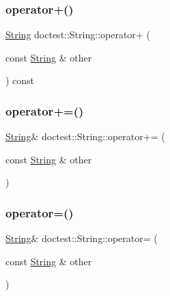 \mbox{\label{classdoctest_1_1_string_a6ddb6cf1b744a0ae1d4e26b3c8dfa827}} 
\subsubsection{\texorpdfstring{operator+()}{operator+()}}
{\footnotesize\ttfamily \hyperlink{classdoctest_1_1_string}{String} doctest\+::\+String\+::operator+ (\begin{DoxyParamCaption}\item[{const \hyperlink{classdoctest_1_1_string}{String} \&}]{other }\end{DoxyParamCaption}) const}

\mbox{\label{classdoctest_1_1_string_ad1df797f12cd140e3d1739f2b30b64d2}} 
\subsubsection{\texorpdfstring{operator+=()}{operator+=()}}
{\footnotesize\ttfamily \hyperlink{classdoctest_1_1_string}{String}\& doctest\+::\+String\+::operator+= (\begin{DoxyParamCaption}\item[{const \hyperlink{classdoctest_1_1_string}{String} \&}]{other }\end{DoxyParamCaption})}

\mbox{\label{classdoctest_1_1_string_a1979700c536cfe9b5fecc328245f74ca}} 
\subsubsection{\texorpdfstring{operator=()}{operator=()}\hspace{0.1cm}{\footnotesize\ttfamily [1/2]}}
{\footnotesize\ttfamily \hyperlink{classdoctest_1_1_string}{String}\& doctest\+::\+String\+::operator= (\begin{DoxyParamCaption}\item[{const \hyperlink{classdoctest_1_1_string}{String} \&}]{other }\end{DoxyParamCaption})}

